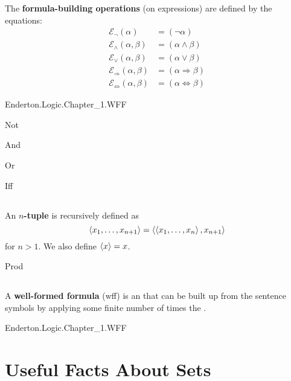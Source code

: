 \documentclass{report}
\begin{document}
  The \textbf{formula-building operations} (on expressions) are defined by the
  equations:
    \begin{align*}
      \mathcal{E}_{\neg}(\alpha)
        & = (\neg \alpha) \\
      \mathcal{E}_{\land}(\alpha, \beta)
        & = (\alpha \land \beta) \\
      \mathcal{E}_{\lor}(\alpha, \beta)
        & = (\alpha \lor \beta) \\
      \mathcal{E}_{\Rightarrow}(\alpha, \beta)
        & = (\alpha \Rightarrow \beta) \\
      \mathcal{E}_{\Leftrightarrow}(\alpha, \beta)
        & = (\alpha \Leftrightarrow \beta)
    \end{align*}

    {Enderton.Logic.Chapter\_1.WFF}

    {Not}

    {And}

    {Or}

    {Iff}

\section{}%

  An \textbf{$n$-tuple} is recursively defined as
    $$\left< x_1, \ldots, x_{n+1} \right> = \left< \left< x_1, \ldots, x_n \right>, x_{n+1} \right>$$
    for $n > 1$.
  We also define $\left< x \right> = x$.

    {Prod}

\section{}%

  A \textbf{well-formed formula} (wff) is an  that can
    be built up from the sentence symbols by applying some finite number of
    times the .

    {Enderton.Logic.Chapter\_1.WFF}

\endgroup

\setcounter{chapter}{0}
\addtocounter{chapter}{-1}
\chapter{Useful Facts About Sets}%
\end{document}
